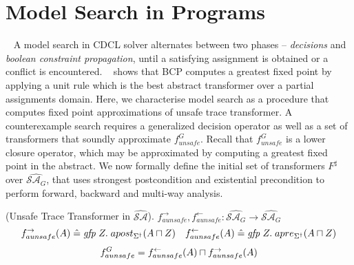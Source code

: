 \section{Model Search in Programs}~\label{model-search}
A model search in CDCL solver alternates between two phases -- \emph{decisions} 
and \emph{boolean constraint propagation}, until a satisfying assignment is
obtained or a conflict is encountered. ~\cite{sas12} shows that BCP computes a
greatest fixed point by applying a unit rule which is the best abstract
transformer over a partial assignments domain.  Here, we characterise model
search as a procedure that computes fixed point approximations of unsafe trace 
transformer.  
%
A counterexample search requires a generalized decision operator as well as a set 
of transformers that soundly approximate $f_{unsafe}^{G}$.  Recall that 
$f_{unsafe}^{G}$ is a lower closure operator, which may be approximated 
by computing a greatest fixed point in the abstract.  
%
We now formally define the initial set of transformers $F^\sharp$ over
$\widehat{\mathcal{SA}_{G}}$, that uses strongest postcondition and 
existential precondition to perform forward, backward and multi-way 
analysis.
%
\begin{definition} (Unsafe Trace Transformer in $\widehat{\mathcal{SA}}$). 
  $f_{aunsafe}^{\rightarrow}, f_{aunsafe}^{\leftarrow} : \widehat{\mathcal{SA}_{G}}
  \rightarrow \widehat{\mathcal{SA}_{G}}$
  \[
    f_{aunsafe}^{\rightarrow}(A) \mathrel{\hat=} \mathit{gfp}\; Z.\;
    apost_{\Sigma^\dagger}(A \sqcap Z)
    \quad
    f_{aunsafe}^{\leftarrow}(A) \mathrel{\hat=} \mathit{gfp}\; Z.\;
    apre_{\Sigma^\dagger}(A \sqcap Z)
  \]
   \[
      f_{aunsafe}^{G} = f_{aunsafe}^{\leftarrow}(A) \sqcap f_{aunsafe}^{\rightarrow}(A) 
   \]  
\end{definition}
%
%
